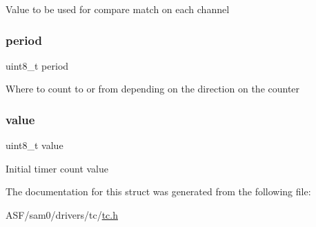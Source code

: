 Value to be used for compare match on each channel \mbox{\label{structtc__8bit__config_a3b3d05afca80e957f9406a1db1f5b8c2}} 
\subsubsection{\texorpdfstring{period}{period}}
{\footnotesize\ttfamily uint8\+\_\+t period}

Where to count to or from depending on the direction on the counter \mbox{\label{structtc__8bit__config_a638e4503e0ae6ce655b7ad2e17e8f0ad}} 
\subsubsection{\texorpdfstring{value}{value}}
{\footnotesize\ttfamily uint8\+\_\+t value}

Initial timer count value 

The documentation for this struct was generated from the following file\+:\begin{DoxyCompactItemize}
\item 
A\+S\+F/sam0/drivers/tc/\mbox{\hyperlink{drivers_2tc_2tc_8h}{tc.\+h}}\end{DoxyCompactItemize}
